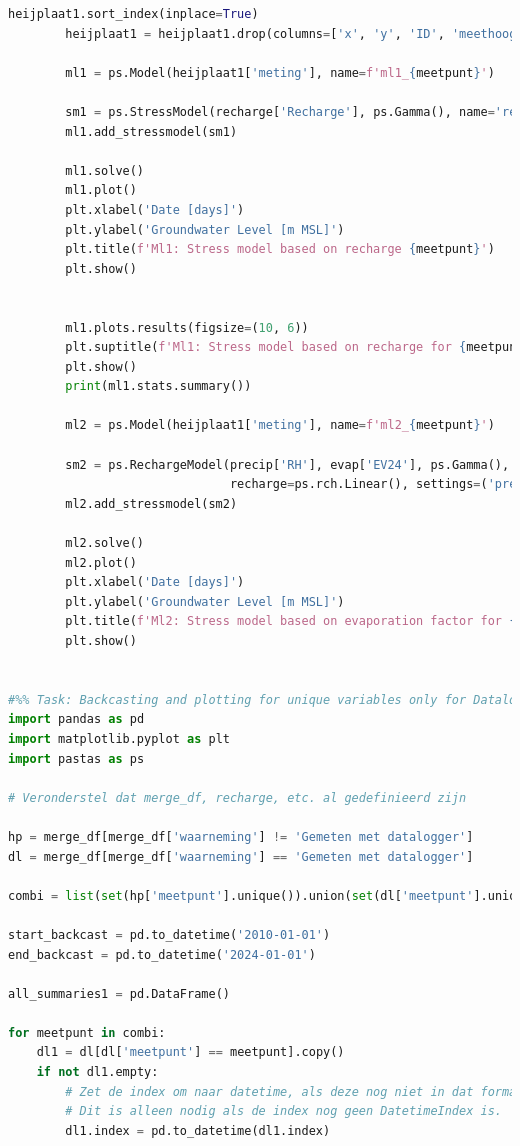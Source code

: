 \begin{lstlisting}[language=Python]
        heijplaat1.sort_index(inplace=True)
        heijplaat1 = heijplaat1.drop(columns=['x', 'y', 'ID', 'meethoogte'])
        
        ml1 = ps.Model(heijplaat1['meting'], name=f'ml1_{meetpunt}')
        
        sm1 = ps.StressModel(recharge['Recharge'], ps.Gamma(), name='recharge', settings='evap')
        ml1.add_stressmodel(sm1)
        
        ml1.solve()
        ml1.plot()
        plt.xlabel('Date [days]')
        plt.ylabel('Groundwater Level [m MSL]')
        plt.title(f'Ml1: Stress model based on recharge {meetpunt}')
        plt.show()
        
        
        ml1.plots.results(figsize=(10, 6))
        plt.suptitle(f'Ml1: Stress model based on recharge for {meetpunt}', y=1.02)
        plt.show()
        print(ml1.stats.summary())
        
        ml2 = ps.Model(heijplaat1['meting'], name=f'ml2_{meetpunt}')
        
        sm2 = ps.RechargeModel(precip['RH'], evap['EV24'], ps.Gamma(), name='Recharge', 
                               recharge=ps.rch.Linear(), settings=('prec', 'evap'))
        ml2.add_stressmodel(sm2)
        
        ml2.solve()
        ml2.plot()
        plt.xlabel('Date [days]')
        plt.ylabel('Groundwater Level [m MSL]')
        plt.title(f'Ml2: Stress model based on evaporation factor for {meetpunt}')
        plt.show()
    

#%% Task: Backcasting and plotting for unique variables only for Datalogger. 
import pandas as pd
import matplotlib.pyplot as plt
import pastas as ps

# Veronderstel dat merge_df, recharge, etc. al gedefinieerd zijn

hp = merge_df[merge_df['waarneming'] != 'Gemeten met datalogger']
dl = merge_df[merge_df['waarneming'] == 'Gemeten met datalogger']

combi = list(set(hp['meetpunt'].unique()).union(set(dl['meetpunt'].unique())))

start_backcast = pd.to_datetime('2010-01-01')
end_backcast = pd.to_datetime('2024-01-01')

all_summaries1 = pd.DataFrame()

for meetpunt in combi:
    dl1 = dl[dl['meetpunt'] == meetpunt].copy()
    if not dl1.empty:
        # Zet de index om naar datetime, als deze nog niet in dat formaat is.
        # Dit is alleen nodig als de index nog geen DatetimeIndex is.
        dl1.index = pd.to_datetime(dl1.index)


\end{lstlisting}
